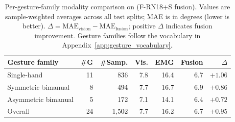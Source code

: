 \begin{table}[h]
\centering
\caption{Per-gesture-family modality comparison on \dataset{} (F-RN18+S fusion). Values are sample-weighted averages across all test splits; MAE is in degrees (lower is better). $\Delta = \text{MAE}_\text{vision} - \text{MAE}_\text{fusion}$; positive $\Delta$ indicates fusion improvement. Gesture families follow the vocabulary in Appendix~\ref{app:gesture_vocabulary}.}
\label{tab:per_gesture_family}
\footnotesize
\setlength{\tabcolsep}{3.8pt}
\renewcommand{\arraystretch}{1.08}
\begin{tabular}{lrrrrrr}
\toprule
Gesture family & \#G & \#Samp. & Vis. & EMG & Fusion & $\Delta$ \\
\midrule
Single-hand & 11 & 836 & 7.8 & 16.4 & 6.7 & $\mathbf{+1.06}$ \\
Symmetric bimanual & 8 & 494 & 7.7 & 16.7 & 6.9 & $+0.86$ \\
Asymmetric bimanual & 5 & 172 & 7.1 & 14.1 & 6.4 & $+0.72$ \\
\midrule
Overall & 24 & 1,502 & 7.7 & 16.2 & 6.7 & $+0.95$ \\
\bottomrule
\end{tabular}
\end{table}